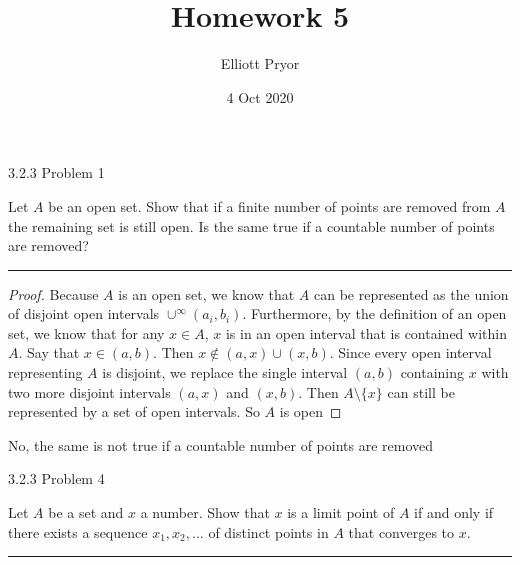 \documentclass[11pt]{article}
\title{Homework 5}
\author{Elliott Pryor}
\date{4 Oct 2020}
\begin{document}
\maketitle



 3.2.3 Problem 1

Let $A$ be an open set. Show that if a finite number of points are removed from $A$ the remaining set is still open. Is the same true if a countable number of points are removed?
\hrule

\begin{proof}

Because $A$ is an open set, we know that $A$ can be represented as the union of disjoint open intervals $\cup^\infty (a_i, b_i)$. 
Furthermore, by the definition of an open set, we know that for any $x \in A$, $x$ is in an open interval that is contained within $A$.
Say that $x \in (a, b)$. Then $x \notin (a, x)\cup(x,b)$. Since every open interval representing $A$ is disjoint, we replace the single interval $(a,b)$ containing $x$ with two more disjoint intervals $(a, x)$ and $(x, b)$. Then $A \setminus \{x\}$ can still be represented by a set of open intervals. So $A$ is open
\end{proof}

No, the same is not true if a countable number of points are removed




\newpage
{} 3.2.3 Problem 4

Let $A$ be a set and $x$ a number. Show that $x$ is a limit point of $A$ if and only if there exists a sequence $x_1, x_2, ...$ of distinct points in $A$ that converges to $x$.

\hrule
\end{document}
